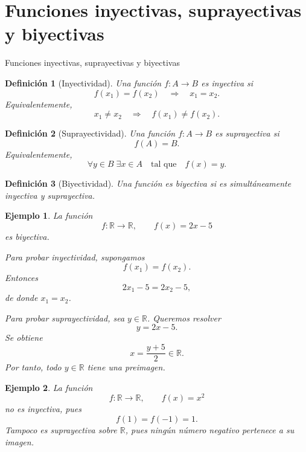 \documentclass[aspectratio=169,10pt]{beamer}
\newtheorem{definicion}{Definición}
\newtheorem{ejemplo}{Ejemplo}
\newcommand{\R}{\mathbb{R}}
\begin{document}
\section{Funciones inyectivas, suprayectivas y biyectivas}
\begin{frame}{Funciones inyectivas, suprayectivas y biyectivas}
\begin{definicion}[Inyectividad]
Una función $f:A\to B$ es inyectiva si
\[
f(x_1)=f(x_2)\quad\Longrightarrow\quad x_1=x_2.
\]
Equivalentemente,
\[
x_1\neq x_2\quad\Longrightarrow\quad f(x_1)\neq f(x_2).
\]
\end{definicion}

\begin{definicion}[Suprayectividad]
Una función $f:A\to B$ es suprayectiva si
\[
f(A)=B.
\]
Equivalentemente,
\[
\forall y\in B\;\exists x\in A
\quad\text{tal que}\quad
f(x)=y.
\]
\end{definicion}

\begin{definicion}[Biyectividad]
Una función es biyectiva si es simultáneamente inyectiva y suprayectiva.
\end{definicion}

\begin{ejemplo}
La función
\[
f:\R\to\R,\qquad f(x)=2x-5
\]
es biyectiva.

Para probar inyectividad, supongamos
\[
f(x_1)=f(x_2).
\]
Entonces
\[
2x_1-5=2x_2-5,
\]
de donde $x_1=x_2$.

Para probar suprayectividad, sea $y\in\R$. Queremos resolver
\[
y=2x-5.
\]
Se obtiene
\[
x=\frac{y+5}{2}\in\R.
\]
Por tanto, todo $y\in\R$ tiene una preimagen.
\end{ejemplo}

\begin{ejemplo}
La función
\[
f:\R\to\R,\qquad f(x)=x^2
\]
no es inyectiva, pues
\[
f(1)=f(-1)=1.
\]
Tampoco es suprayectiva sobre $\R$, pues ningún número negativo pertenece a su
imagen.
\end{ejemplo}

\end{frame}
\end{document}
